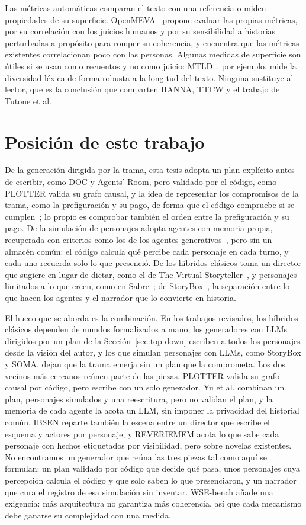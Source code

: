 Las métricas automáticas comparan el texto con una referencia o miden propiedades de su superficie.
OpenMEVA~\cite{guan2021} propone evaluar las propias métricas, por su correlación con los juicios
humanos y por su sensibilidad a historias perturbadas a propósito para romper su coherencia, y
encuentra que las métricas existentes correlacionan poco con las personas. Algunas medidas de
superficie son útiles si se usan como recuentos y no como juicio: MTLD~\cite{mccarthy2010}, por
ejemplo, mide la diversidad léxica de forma robusta a la longitud del texto. Ninguna sustituye al
lector, que es la conclusión que comparten HANNA, TTCW y el trabajo de Tutone et al.

\section{Posición de este trabajo}\label{sec:posicion}

De la generación dirigida por la trama, esta tesis adopta un plan explícito antes de escribir, como
DOC y Agents' Room, pero validado por el código, como PLOTTER valida su grafo causal, y la idea de
representar los compromisos de la trama, como la prefiguración y su pago, de forma que el código
compruebe si se cumplen~\cite{yun2026}; lo propio es comprobar también el orden entre la
prefiguración y su pago. De la simulación de personajes adopta agentes con memoria propia,
recuperada con criterios como los de los agentes generativos~\cite{park2023}, pero sin un almacén
común: el código calcula qué percibe cada personaje en cada turno, y cada uno recuerda solo lo que
presenció. De los híbridos clásicos toma un director que sugiere en lugar de dictar, como el de The
Virtual Storyteller~\cite{theune2003}, y personajes limitados a lo que creen, como en
Sabre~\cite{ware2021}; de StoryBox~\cite{chen2026a}, la separación entre lo que hacen los agentes y el
narrador que lo convierte en historia.

El hueco que se aborda es la combinación. En los trabajos revisados, los híbridos clásicos dependen
de mundos formalizados a mano; los generadores con LLMs dirigidos por un plan de la
Sección~\ref{sec:top-down} escriben a todos los personajes desde la visión del autor, y los que
simulan personajes con LLMs, como StoryBox y SOMA, dejan que la trama emerja sin un plan que la
comprometa. Los dos vecinos más cercanos reúnen parte de las piezas. PLOTTER valida su grafo causal
por código, pero escribe con un solo generador. Yu et al. combinan un plan, personajes simulados y
una reescritura, pero no validan el plan, y la memoria de cada agente la acota un LLM, sin imponer la
privacidad del historial común. IBSEN reparte también la escena entre un director que escribe el
esquema y actores por personaje, y REVERIEMEM acota lo que sabe cada personaje con hechos etiquetados
por visibilidad, pero sobre novelas existentes. No encontramos un generador que reúna las tres piezas tal como aquí se
formulan: un plan validado por código que decide qué pasa, unos personajes cuya percepción calcula el
código y que solo saben lo que presenciaron, y un narrador que cura el registro de esa simulación sin
inventar. WSE-bench añade una exigencia: más arquitectura no garantiza más coherencia, así que cada
mecanismo debe ganarse su complejidad con una medida.

